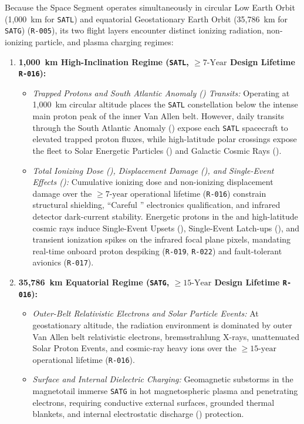 Because the  Space Segment operates simultaneously in circular Low Earth Orbit (1,000~km for \texttt{SATL}) and equatorial Geostationary Earth Orbit (35,786~km for \texttt{SATG}) (\texttt{R-005}), its two flight layers encounter distinct ionizing radiation, non-ionizing particle, and plasma charging regimes:
\begin{enumerate}
    \item \textbf{1,000~km High-Inclination  Regime (\texttt{SATL}, $\ge 7\text{-Year}$ Design Lifetime \texttt{R-016}):}
    \begin{itemize}
        \item \emph{Trapped Protons and South Atlantic Anomaly () Transits:} Operating at 1,000~km circular altitude places the \texttt{SATL} constellation below the intense main proton peak of the inner Van Allen belt. However, daily transits through the South Atlantic Anomaly () expose each \texttt{SATL} spacecraft to elevated trapped proton fluxes, while high-latitude polar crossings expose the fleet to Solar Energetic Particles () and Galactic Cosmic Rays ().
        \item \emph{Total Ionizing Dose (), Displacement Damage (), and Single-Event Effects ():} Cumulative ionizing dose and non-ionizing displacement damage over the $\ge 7\text{-year}$ operational lifetime (\texttt{R-016}) constrain structural shielding, ``Careful '' electronics qualification, and infrared detector dark-current stability. Energetic protons in the  and high-latitude cosmic rays induce Single-Event Upsets (), Single-Event Latch-ups (), and transient ionization spikes on the infrared focal plane pixels, mandating real-time onboard proton despiking (\texttt{R-019}, \texttt{R-022}) and fault-tolerant avionics (\texttt{R-017}).
    \end{itemize}
    \item \textbf{35,786~km Equatorial  Regime (\texttt{SATG}, $\ge 15\text{-Year}$ Design Lifetime \texttt{R-016}):}
    \begin{itemize}
        \item \emph{Outer-Belt Relativistic Electrons and Solar Particle Events:} At geostationary altitude, the radiation environment is dominated by outer Van Allen belt relativistic electrons, bremsstrahlung X-rays, unattenuated Solar Proton Events, and cosmic-ray heavy ions over the $\ge 15\text{-year}$ operational lifetime (\texttt{R-016}).
        \item \emph{Surface and Internal Dielectric Charging:} Geomagnetic substorms in the magnetotail immerse \texttt{SATG} in hot magnetospheric plasma and penetrating electrons, requiring conductive external surfaces, grounded thermal blankets, and internal electrostatic discharge () protection.
    \end{itemize}
\end{enumerate}

